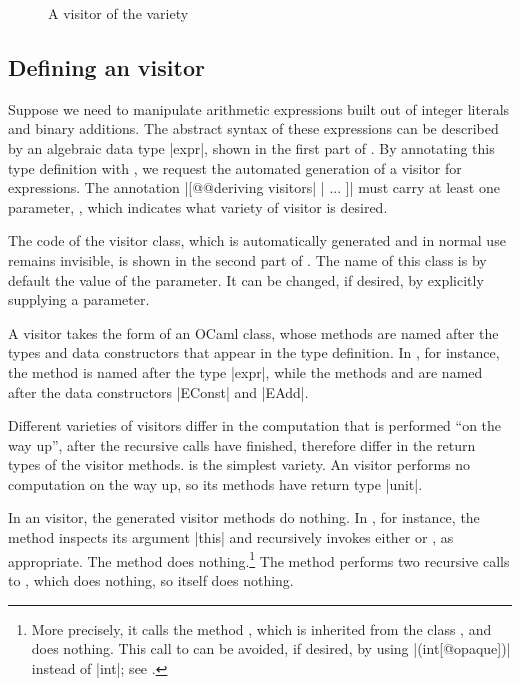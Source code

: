 \documentclass[11pt,a4paper,twoside]{article}
\begin{document}

\begin{figure}[t]
\vspace{-\baselineskip}
\caption{A visitor of the \iter variety}
\label{fig:expr00}
\end{figure}

\subsection{Defining an \iter visitor}
\label{sec:intro:iter:def}

Suppose we need to manipulate arithmetic expressions built out of integer
literals and binary additions. The abstract syntax of these expressions can be
described by an algebraic data type \oc|expr|, shown in the first part of
.
%
By annotating this type definition with \derivingvisitors, we
request the automated generation of a visitor for expressions. The annotation
\oc|[@@deriving visitors| \oc|{ ... }]| must carry at least one parameter,
\variety, which indicates what variety of visitor is desired.

The code of the visitor class, which is automatically generated and in normal
use remains invisible, is shown in the second part of . The
name of this class is by default the value of the \variety parameter. It can
be changed, if desired, by explicitly supplying a \name parameter.

A visitor takes the form of an OCaml class, whose methods are named after the
types and data constructors that appear in the type definition. In
, for instance, the method  is named after
the type \oc|expr|, while the methods  and
 are named after the data constructors \oc|EConst| and
\oc|EAdd|.

Different varieties of visitors differ in the computation that is performed
``on the way up'', after the recursive calls have finished, therefore differ
in the return types of the visitor methods. \iter is the simplest variety. An
\iter visitor performs no computation on the way up, so its methods have
return type \oc|unit|.

In an \iter visitor, the generated visitor methods do nothing. In
, for instance, the method  inspects its
argument \oc|this| and recursively invokes either  or
, as appropriate. The method  does
nothing.\footnote{More precisely, it calls the method ,
  which is inherited from the class , and does
  nothing. This call to  can be avoided, if desired, by using
  \oc|(int[@opaque])| instead of \oc|int|; see .} The method
 performs two recursive calls to ,
which does nothing, so  itself does nothing.
\end{document}
